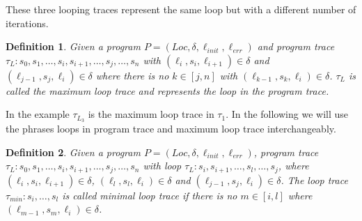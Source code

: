 \documentclass{article}
\newcounter{example}[section]
\newtheorem{mydef}{Definition}
\begin{document}
\begin{figure}[H]
    \centering
\end{figure}
These three looping traces represent the same loop but with a different number of iterations.

\begin{mydef}
    Given a program $P = (Loc, \delta, \ell_{init}, \ell_{err})$ and program trace \\ $\tau_L: s_0, s_1, \ldots, s_i, s_{i+1}, \ldots, s_j, \ldots, s_n$ with $(\ell_i, s_i, \ell_{i+1}) \in \delta$ and $(\ell_{j-1}, s_j, \ell_i) \in \delta$ where there is no $k \in [j, n]$ with $(\ell_{k-1}, s_k, \ell_i) \in \delta$. $\tau_L$ is called the maximum loop trace and represents the loop in the program trace.
\end{mydef}
In the example $\tau_{L_3}$ is the maximum loop trace in $\tau_1$. In the following we will use the phrases loops in program trace and maximum loop trace interchangeably. 

\begin{mydef}
    Given a program $P = (Loc, \delta, \ell_{init}, \ell_{err})$, program trace \\ $\tau_L: s_0, s_1, \ldots, s_i, s_{i+1}, \ldots, s_j, \ldots, s_n$ with loop $\tau_L: s_i, s_{i+1}, \ldots, s_l, \ldots, s_j$, where $(\ell_i, s_i, \ell_{i+1}) \in \delta$, $(\ell_l, s_l, \ell_i) \in \delta$ and $(\ell_{j-1}, s_j, \ell_i) \in \delta$. The loop trace $\tau_{min}: s_i, \ldots, s_l$ is called minimal loop trace if there is no $m \in [i, l]$ where $(\ell_{m-1}, s_m, \ell_i) \in \delta$.
\end{mydef}
\end{document}
